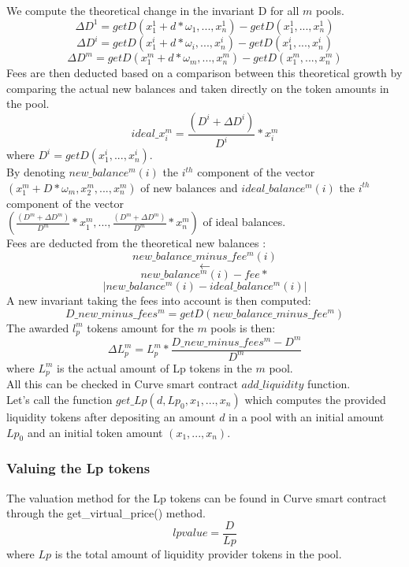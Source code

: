 \documentclass[conference]{IEEEtran}
\begin{document}
We compute the theoretical change in the invariant D for all $m$ pools.
$$
\Delta D^1 = getD(x_1^1+ d*\omega_1, ...,x_n^1)  - getD(x_1^1, ...,x_n^1)
$$
$$
\Delta D^i = getD(x_1^i+ d*\omega_i, ...,x_n^i)-getD(x_1^i, ...,x_n^i) $$
$$
\Delta D^m = getD(x_1^m+ d*\omega_m, ...,x_n^m)-getD(x_1^m, ...,x_n^m)
$$
Fees are then deducted based on a comparison between this theoretical growth by comparing the actual new balances and taken directly on the token amounts in the pool.\\
$$
ideal\_x_i^m = \frac{( D^i + \Delta D^i)}{D^i} *x_i^m
$$
where $D^i = getD(x_1^i, ...,x_n^i)$.\\
By denoting $new\_balance^m(i)$ the $i^{th}$ component of the vector\\
$(x_1^m + D*\omega_m,x_2^m,...,x_n^m)$ of new balances and  $ideal\_balance^m(i)$ the $i^{th}$ component of the vector\\ 
$( \frac{( D^m + \Delta D^m)}{D^m} *x_1^m,..., \frac{( D^m + \Delta D^m)}{D^m} *x_n^m)$ of ideal balances.\\
Fees are deducted from the theoretical new balances :
\begin{equation}
new\_balance\_minus\_fee^m(i) 
\end{equation}
$$
\leftarrow
$$
$$
new\_balance^m(i) - fee*
$$
$$
\lvert new\_balance^m(i) -ideal\_balance^m(i)\rvert   
$$
A new invariant taking the fees into account is then computed:\\
\begin{equation}
D\_new\_minus\_fees^m =getD(new\_balance\_minus\_fee^m)
\end{equation}
The awarded $l_p^m$ tokens amount for the $m$ pools is then:
\begin{equation}
\Delta L_p^m = L_p^m*\frac{D\_new\_minus\_fees^m - D^m}{D^m}
\end{equation}
where $L_p^m$ is the actual amount of Lp tokens in the $m$ pool.\\
All this can be checked in Curve smart contract $add\_liquidity$ function.\\
Let's call the function $get\_Lp(d, Lp_0, x_1, ...,x_n)$ which computes the provided liquidity tokens after depositing an amount $d$ in a pool with an initial amount $Lp_0$ and an initial token amount $(x_1, ...,x_n)$.\\
\subsubsection{Valuing the Lp tokens}\label{value}
The valuation method for the Lp tokens can be found in Curve smart contract through the get\_virtual\_price() method.
\begin{equation}
    lpvalue = \frac{D}{Lp}
\end{equation}
where $Lp$ is the total amount of liquidity provider tokens in the pool.
\end{document}
